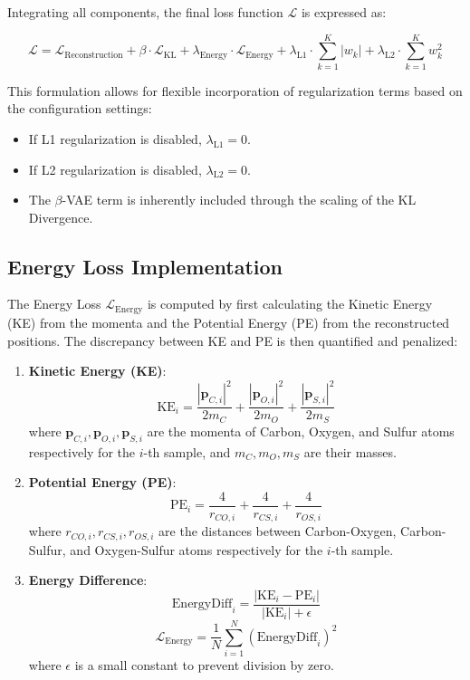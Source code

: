 \documentclass[12pt]{article}
\begin{document}
Integrating all components, the final loss function \( \mathcal{L} \) is expressed as:

\[
\mathcal{L} = \mathcal{L}_{\text{Reconstruction}} + \beta \cdot \mathcal{L}_{\text{KL}} + \lambda_{\text{Energy}} \cdot \mathcal{L}_{\text{Energy}} + \lambda_{\text{L1}} \cdot \sum_{k=1}^{K} |w_k| + \lambda_{\text{L2}} \cdot \sum_{k=1}^{K} w_k^2
\]

This formulation allows for flexible incorporation of regularization terms based on the configuration settings:

\begin{itemize}
    \item If L1 regularization is disabled, \( \lambda_{\text{L1}} = 0 \).
    \item If L2 regularization is disabled, \( \lambda_{\text{L2}} = 0 \).
    \item The \(\beta\)-VAE term is inherently included through the scaling of the KL Divergence.
\end{itemize}

\subsection{Energy Loss Implementation}

The Energy Loss \( \mathcal{L}_{\text{Energy}} \) is computed by first calculating the Kinetic Energy (KE) from the momenta and the Potential Energy (PE) from the reconstructed positions. The discrepancy between KE and PE is then quantified and penalized:

\begin{enumerate}[label=\alph*.]
    \item \textbf{Kinetic Energy (KE)}:
    \[
    \text{KE}_i = \frac{|\mathbf{p}_{C,i}|^2}{2m_C} + \frac{|\mathbf{p}_{O,i}|^2}{2m_O} + \frac{|\mathbf{p}_{S,i}|^2}{2m_S}
    \]
    where \( \mathbf{p}_{C,i}, \mathbf{p}_{O,i}, \mathbf{p}_{S,i} \) are the momenta of Carbon, Oxygen, and Sulfur atoms respectively for the \( i \)-th sample, and \( m_C, m_O, m_S \) are their masses.

    \item \textbf{Potential Energy (PE)}:
    \[
    \text{PE}_i = \frac{4}{r_{CO,i}} + \frac{4}{r_{CS,i}} + \frac{4}{r_{OS,i}}
    \]
    where \( r_{CO,i}, r_{CS,i}, r_{OS,i} \) are the distances between Carbon-Oxygen, Carbon-Sulfur, and Oxygen-Sulfur atoms respectively for the \( i \)-th sample.

    \item \textbf{Energy Difference}:
    \[
    \text{EnergyDiff}_i = \frac{|\text{KE}_i - \text{PE}_i|}{|\text{KE}_i| + \epsilon}
    \]
    \[
    \mathcal{L}_{\text{Energy}} = \frac{1}{N} \sum_{i=1}^{N} (\text{EnergyDiff}_i)^2
    \]
    where \( \epsilon \) is a small constant to prevent division by zero.
\end{enumerate}
\end{document}
